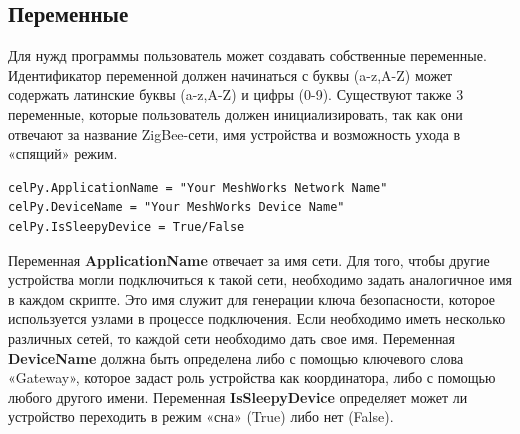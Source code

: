 \documentclass[12pt]{article}
\begin{document}
\subsection{Переменные}
Для нужд программы пользователь может создавать собственные переменные. 
Идентификатор переменной должен начинаться с буквы (a-z,A-Z) может содержать 
латинские буквы (a-z,A-Z) и цифры (0-9).
Существуют также 3 переменные, которые пользователь должен инициализировать, так 
как они отвечают за название ZigBee-сети, имя устройства и возможность ухода в 
«спящий» режим.
\begin{verbatim}
celPy.ApplicationName = "Your MeshWorks Network Name"
celPy.DeviceName = "Your MeshWorks Device Name"
celPy.IsSleepyDevice = True/False
\end{verbatim}
Переменная \textbf{ApplicationName} отвечает за имя сети. Для того, чтобы другие 
устройства могли подключиться к такой сети, необходимо задать аналогичное имя в 
каждом скрипте. Это имя служит для генерации ключа безопасности, которое используется 
узлами в процессе подключения. Если необходимо иметь несколько различных сетей, 
то каждой сети необходимо дать свое имя.
Переменная \textbf{DeviceName} должна быть определена либо с помощью ключевого 
слова «Gateway», которое задаст роль устройства как координатора, либо с помощью 
любого другого имени.
Переменная \textbf{IsSleepyDevice} определяет может ли устройство переходить в 
режим «сна» (True) либо нет (False).
\end{document}
